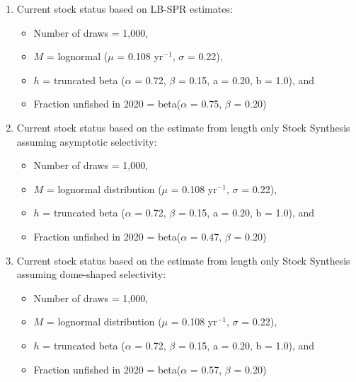 \documentclass[11pt,
  english,
  a4paper,
]{article}
\begin{document}
\begin{enumerate}  
    \item Current stock status based on LB-SPR estimates: 
        \begin{itemize}
        \item Number of draws = 1,000,
        \item $M$ = lognormal ($\mu$ = 0.108 yr$^{-1}$, $\sigma$ = 0.22),
        \item $h$ = truncated beta ($\alpha$ = 0.72, $\beta$ = 0.15, a = 0.20, b = 1.0), and
        \item Fraction unfished in 2020 = beta($\alpha$ = 0.75, $\beta$ = 0.20) 
    \end{itemize}
    \item Current stock status based on the estimate from length only Stock Synthesis assuming asymptotic selectivity:
    \begin{itemize}
        \item Number of draws = 1,000,
        \item $M$ = lognormal distribution ($\mu$ = 0.108 yr$^{-1}$, $\sigma$ = 0.22),
        \item $h$ = truncated beta ($\alpha$ = 0.72, $\beta$ = 0.15, a = 0.20, b = 1.0), and
        \item Fraction unfished in 2020 = beta($\alpha$ = 0.47, $\beta$ = 0.20)
    \end{itemize}   
    \item Current stock status based on the estimate from length only Stock Synthesis assuming dome-shaped selectivity:
    \begin{itemize}
        \item Number of draws = 1,000,
        \item $M$ = lognormal distribution ($\mu$ = 0.108 yr$^{-1}$, $\sigma$ = 0.22),
        \item $h$ = truncated beta ($\alpha$ = 0.72, $\beta$ = 0.15, a = 0.20, b = 1.0), and
        \item Fraction unfished in 2020 = beta($\alpha$ = 0.57, $\beta$ = 0.20)
    \end{itemize}
\end{enumerate}

\end{document}
